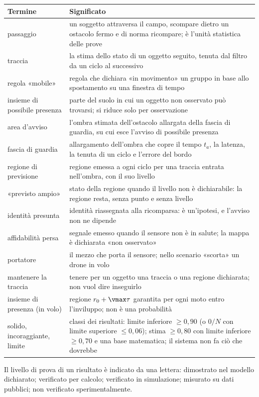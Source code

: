 {\medskip
\begin{tabularx}{\textwidth}{@{}p{3.6cm}L@{}}
\toprule
Termine & Significato\\
\midrule
passaggio & un soggetto attraversa il campo, scompare dietro un ostacolo fermo e di norma ricompare; è l'unità statistica delle prove\\
traccia & la stima dello stato di un oggetto seguito, tenuta dal filtro da un ciclo al successivo\\
regola «mobile» & regola che dichiara «in movimento» un gruppo in base allo spostamento su una finestra di tempo\\
insieme di possibile presenza & parte del suolo in cui un oggetto non osservato può trovarsi; si riduce solo per osservazione\\
area d'avviso & l'ombra stimata dell'ostacolo allargata della fascia di guardia, su cui esce l'avviso di possibile presenza\\
fascia di guardia & allargamento dell'ombra che copre il tempo $t_a$, la latenza, la tenuta di un ciclo e l'errore del bordo\\
regione di previsione & regione emessa a ogni ciclo per una traccia entrata nell'ombra, con il suo livello\\
«previsto ampio» & stato della regione quando il livello non è dichiarabile: la regione resta, senza punto e senza livello\\
identità presunta & identità riassegnata alla ricomparsa: è un'ipotesi, e l'avviso non ne dipende\\
affidabilità persa & segnale emesso quando il sensore non è in salute; la mappa è dichiarata «non osservato»\\
portatore & il mezzo che porta il sensore; nello scenario «scorta» un drone in volo\\
mantenere la traccia & tenere per un oggetto una traccia o una regione dichiarata; non vuol dire inseguirlo\\
insieme di presenza (in volo) & regione $r_0+\vmax\tau$ garantita per ogni moto entro l'inviluppo; non è una probabilità\\
solido, incoraggiante, limite & classi dei risultati: limite inferiore $\ge0{,}90$ (o $0/N$ con limite superiore $\le0{,}06$); stima $\ge0{,}80$ con limite inferiore $\ge0{,}70$ e una base matematica; il sistema non fa ciò che dovrebbe\\
\bottomrule
\end{tabularx}}

Il livello di prova di un risultato è indicato da una lettera:  dimostrato nel modello dichiarato;  verificato per calcolo;  verificato in simulazione;  misurato su dati pubblici;  non verificato sperimentalmente.
